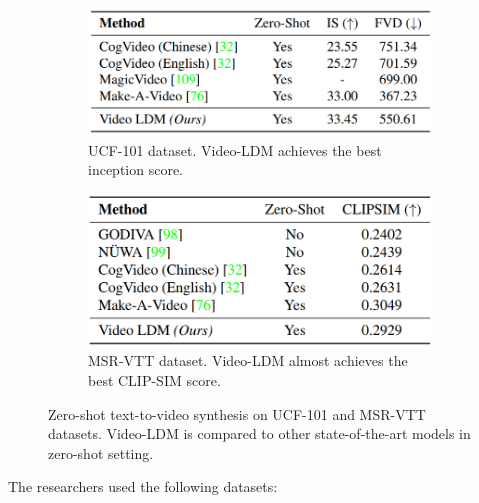 \begin{figure}
    \centering

    \begin{subfigure}{0.45\textwidth}
        \centering
        \includegraphics[width=0.8\linewidth]{images/video_ldm/ucf.png}
        \caption{UCF-101 dataset. Video-LDM achieves the best inception score.}
    \end{subfigure}

    \begin{subfigure}{0.45\textwidth}
        \centering
        \includegraphics[width=0.8\linewidth]{images/video_ldm/msr_vtt.png}
        \caption{MSR-VTT dataset. Video-LDM almost achieves the best CLIP-SIM score.}
    \end{subfigure}

    \caption{Zero-shot text-to-video synthesis on UCF-101 and MSR-VTT datasets. Video-LDM is compared to other state-of-the-art models in zero-shot setting.}
\end{figure}




The researchers used the following datasets:

